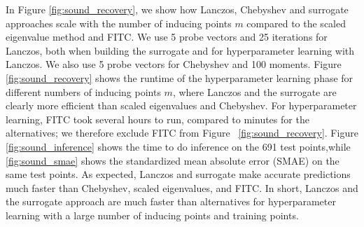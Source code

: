 In Figure \ref{fig:sound_recovery}, we show how Lanczos, Chebyshev and
surrogate approaches scale with the number of inducing points $m$ compared to
the scaled eigenvalue method and FITC.  We use 5 probe vectors and 25 iterations
for Lanczos, both when building the surrogate and for hyperparameter learning
with Lanczos. We also use 5 probe vectors for Chebyshev and 100 moments. Figure 
\ref{fig:sound_recovery} shows the runtime of the hyperparameter learning phase
for different numbers of inducing points $m$, where Lanczos and the surrogate
are clearly more efficient than scaled eigenvalues and Chebyshev. For
hyperparameter learning, FITC took several hours to run, compared to minutes for
the alternatives; we therefore exclude FITC from Figure~
\ref{fig:sound_recovery}. Figure \ref{fig:sound_inference} shows the time to do
inference on the 691 test points,while \ref{fig:sound_smae} shows the
standardized mean absolute error (SMAE) on the same test points. As expected,
Lanczos and surrogate make accurate predictions much faster than Chebyshev,
scaled eigenvalues, and FITC.
%
In short, Lanczos and the surrogate approach are much faster than alternatives
for hyperparameter learning with a large number of inducing points and training
points.

